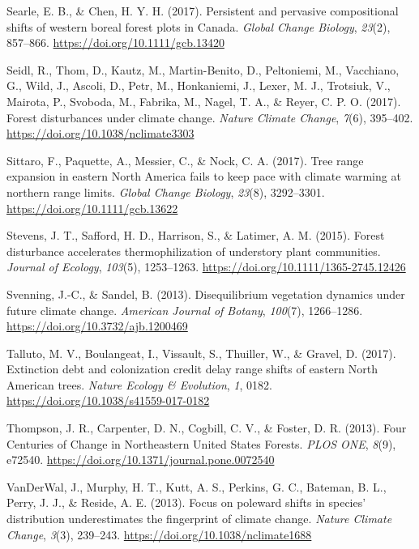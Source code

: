 \documentclass[
  a4paperpaper,
]{article}
\begin{document}
\leavevmode\hypertarget{ref-searle_persistent_2017}{}%
Searle, E. B., \& Chen, H. Y. H. (2017). Persistent and pervasive
compositional shifts of western boreal forest plots in Canada.
\emph{Global Change Biology}, \emph{23}(2), 857--866.
\url{https://doi.org/10.1111/gcb.13420}

\leavevmode\hypertarget{ref-seidl_forest_2017}{}%
Seidl, R., Thom, D., Kautz, M., Martin-Benito, D., Peltoniemi, M.,
Vacchiano, G., Wild, J., Ascoli, D., Petr, M., Honkaniemi, J., Lexer, M.
J., Trotsiuk, V., Mairota, P., Svoboda, M., Fabrika, M., Nagel, T. A.,
\& Reyer, C. P. O. (2017). Forest disturbances under climate change.
\emph{Nature Climate Change}, \emph{7}(6), 395--402.
\url{https://doi.org/10.1038/nclimate3303}

\leavevmode\hypertarget{ref-sittaro_tree_2017}{}%
Sittaro, F., Paquette, A., Messier, C., \& Nock, C. A. (2017). Tree
range expansion in eastern North America fails to keep pace with climate
warming at northern range limits. \emph{Global Change Biology},
\emph{23}(8), 3292--3301. \url{https://doi.org/10.1111/gcb.13622}

\leavevmode\hypertarget{ref-stevens_forest_2015}{}%
Stevens, J. T., Safford, H. D., Harrison, S., \& Latimer, A. M. (2015).
Forest disturbance accelerates thermophilization of understory plant
communities. \emph{Journal of Ecology}, \emph{103}(5), 1253--1263.
\url{https://doi.org/10.1111/1365-2745.12426}

\leavevmode\hypertarget{ref-svenning_disequilibrium_2013}{}%
Svenning, J.-C., \& Sandel, B. (2013). Disequilibrium vegetation
dynamics under future climate change. \emph{American Journal of Botany},
\emph{100}(7), 1266--1286. \url{https://doi.org/10.3732/ajb.1200469}

\leavevmode\hypertarget{ref-talluto_extinction_2017}{}%
Talluto, M. V., Boulangeat, I., Vissault, S., Thuiller, W., \& Gravel,
D. (2017). Extinction debt and colonization credit delay range shifts of
eastern North American trees. \emph{Nature Ecology \& Evolution},
\emph{1}, 0182. \url{https://doi.org/10.1038/s41559-017-0182}

\leavevmode\hypertarget{ref-thompson_four_2013}{}%
Thompson, J. R., Carpenter, D. N., Cogbill, C. V., \& Foster, D. R.
(2013). Four Centuries of Change in Northeastern United States Forests.
\emph{PLOS ONE}, \emph{8}(9), e72540.
\url{https://doi.org/10.1371/journal.pone.0072540}

\leavevmode\hypertarget{ref-vanderwal_focus_2013}{}%
VanDerWal, J., Murphy, H. T., Kutt, A. S., Perkins, G. C., Bateman, B.
L., Perry, J. J., \& Reside, A. E. (2013). Focus on poleward shifts in
species' distribution underestimates the fingerprint of climate change.
\emph{Nature Climate Change}, \emph{3}(3), 239--243.
\url{https://doi.org/10.1038/nclimate1688}
\end{document}
